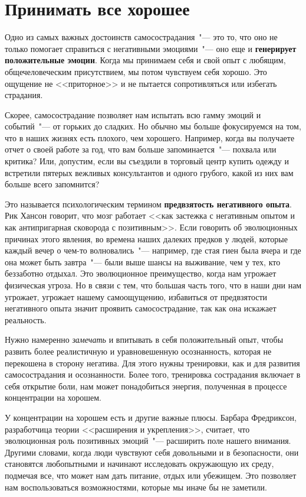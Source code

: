 
\chapter{Принимать все хорошее} \label{Embracing_the_Good}

Одно из самых важных достоинств самосострадания~"--- это то, что оно не только помогает справиться с негативными эмоциями~"--- оно еще и \textbf{генерирует положительные эмоции}. Когда мы принимаем себя и свой опыт с любящим, общечеловеческим присутствием, мы потом чувствуем себя хорошо. Это ощущение не <<приторное>> и не пытается сопротивляться или избегать страдания. 

Скорее, самосострадание позволяет нам испытать всю гамму эмоций и событий~"--- от горьких до сладких. Но обычно мы больше фокусируемся на том, что в наших жизнях есть плохого, чем хорошего. Например, когда вы получаете отчет о своей работе за год, что вам больше запоминается~"--- похвала или критика? Или, допустим, если вы съездили в торговый центр купить одежду и встретили пятерых вежливых консультантов и одного грубого, какой из них вам больше всего запомнится?

Это называется психологическим термином \textbf{предвзятость негативного опыта}. Рик Хансон говорит, что мозг работает <<как застежка с негативным опытом и как антипригарная сковорода с позитивным>>. Если говорить об эволюционных причинах этого явления, во времена наших далеких предков у  людей, которые каждый вечер о чем-то волновались~"--- например, где стая гиен была вчера и где она может быть завтра~"--- были выше шансы на выживание, чем у тех, кто беззаботно отдыхал. Это эволюционное преимущество, когда нам угрожает физическая угроза. Но в связи с тем, что большая часть того, что в наши дни нам угрожает, угрожает нашему самоощущению, избавиться от предвзятости негативного опыта значит проявить самосострадание, так как она искажает реальность.  

Нужно намеренно \emph{замечать} и впитывать в себя положительный опыт, чтобы развить более реалистичную и уравновешенную осознанность, которая не перекошена в сторону негатива. Для этого нужны тренировки, как и для развития самосострадания и осознанности. Более того, тренировка сострадания включает в себя открытие боли, нам может понадобиться энергия, полученная в процессе концентрации на хорошем.  

У концентрации на хорошем есть и другие важные плюсы. Барбара Фредриксон, разработчица теории <<расширения и укрепления>>, считает, что эволюционная роль позитивных эмоций~"--- расширить поле нашего внимания. Другими словами, когда люди чувствуют себя довольными и в безопасности, они становятся любопытными и начинают исследовать окружающую их среду, подмечая все, что может нам дать питание, отдых или убежищем. Это позволяет нам воспользоваться возможностями, которые мы иначе бы не заметили.  

